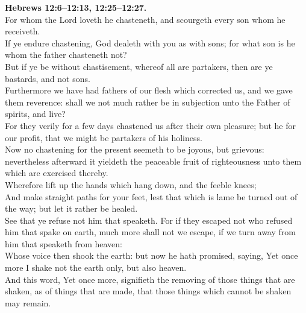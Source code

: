 \documentclass[10pt]{article} %
\begin{document}
{\begin{minipage}[t]{0.45\textwidth}
\textbf{Hebrews 12:6--12:13, 12:25--12:27.}\\
For whom the Lord loveth he chasteneth, and scourgeth every son whom he receiveth.\\
If ye endure chastening, God dealeth with you as with sons; for what son is he whom the father chasteneth not?\\
But if ye be without chastisement, whereof all are partakers, then are ye bastards, and not sons.\\
Furthermore we have had fathers of our flesh which corrected us, and we gave them reverence: shall we not much rather be in subjection unto the Father of spirits, and live?\\
For they verily for a few days chastened us after their own pleasure; but he for our profit, that we might be partakers of his holiness.\\
Now no chastening for the present seemeth to be joyous, but grievous: nevertheless afterward it yieldeth the peaceable fruit of righteousness unto them which are exercised thereby.\\
Wherefore lift up the hands which hang down, and the feeble knees;\\
And make straight paths for your feet, lest that which is lame be turned out of the way; but let it rather be healed.\\
See that ye refuse not him that speaketh. For if they escaped not who refused him that spake on earth, much more shall not we escape, if we turn away from him that speaketh from heaven:\\
Whose voice then shook the earth: but now he hath promised, saying, Yet once more I shake not the earth only, but also heaven.\\
And this word, Yet once more, signifieth the removing of those things that are shaken, as of things that are made, that those things which cannot be shaken may remain.\\

\end{minipage}}
\vspace*{\fill}
\newpage
\huge%
\vspace*{\fill}
\end{document}
